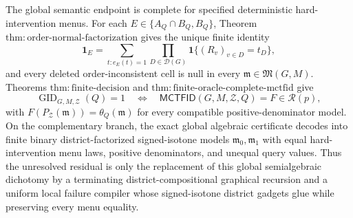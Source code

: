 The global semantic endpoint is complete for specified deterministic hard-intervention menus.  For each \(E\in\{A_Q\cap B_Q,B_Q\}\), Theorem \(\mathrm{thm:order\text{-}normal\text{-}factorization}\) gives the unique finite identity
\[
 \mathbf 1_E
 =\sum_{t:e_E(t)=1}\prod_{D\in\mathcal D(G)}
   \mathbf 1\{(R_v)_{v\in D}=t_D\},
\]
and every deleted order-inconsistent cell is null in every \(\mathfrak m\in\mathfrak M(G,M)\).  Theorems \(\mathrm{thm:finite\text{-}decision}\) and \(\mathrm{thm:finite\text{-}oracle\text{-}complete\text{-}mctfid}\) give
\[
 \operatorname{GID}_{G,M,\mathcal Z}(Q)=1
 \quad\Longleftrightarrow\quad
 \mathsf{MCTFID}(G,M,\mathcal Z,Q)=F\in\mathcal R(p),
\]
with \(F(P_{\mathcal Z}(\mathfrak m))=\theta_Q(\mathfrak m)\) for every compatible positive-denominator model.  On the complementary branch, the exact global algebraic certificate decodes into finite binary district-factorized signed-isotone models \(\mathfrak m_0,\mathfrak m_1\) with equal hard-intervention menu laws, positive denominators, and unequal query values.  Thus the unresolved residual is only the replacement of this global semialgebraic dichotomy by a terminating district-compositional graphical recursion and a uniform local failure compiler whose signed-isotone district gadgets glue while preserving every menu equality.